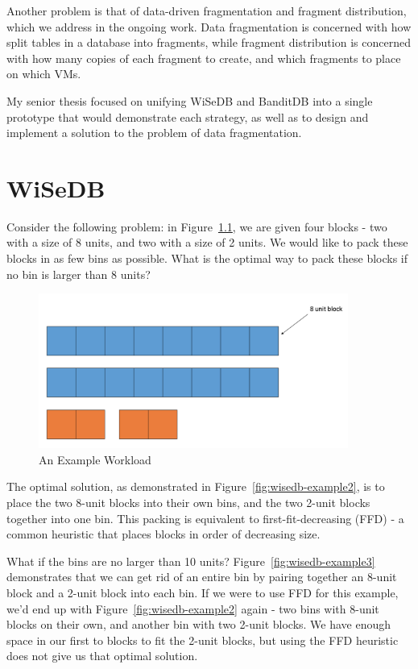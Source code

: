 \documentclass{brandiss}
\numberwithin{section}{chapter}
\numberwithin{figure}{chapter}
\theoremstyle{definition}
\theoremstyle{plain}
\theoremstyle{remark}
\begin{document}
Another problem is that of data-driven fragmentation and fragment distribution, which we address in the ongoing work. Data fragmentation is concerned with how split tables in a database into fragments, while fragment distribution is concerned with how many copies of each fragment to create, and which fragments to place on which VMs.

My senior thesis focused on unifying WiSeDB and BanditDB into a single prototype that would demonstrate each strategy, as well as to design and implement a solution to the problem of data fragmentation.

\clearpage

\chapter{WiSeDB}

Consider the following problem: in Figure~\ref{fig:wisedb-example1}, we are given four blocks - two with a size of 8 units, and two with a size of 2 units. We would like to pack these blocks in as few bins as possible. What is the optimal way to pack these blocks if no bin is larger than 8 units?

\begin{figure}[htbp]
  \centering
  \includegraphics[height=2in]{wisedb-example1}
  \caption{An Example Workload}
  \label{fig:wisedb-example1}
\end{figure}

The optimal solution, as demonstrated in Figure~\ref{fig:wisedb-example2}, is to place the two 8-unit blocks into their own bins, and the two 2-unit blocks together into one bin. This packing is equivalent to first-fit-decreasing (FFD) - a common heuristic that places blocks in order of decreasing size.

What if the bins are no larger than 10 units? Figure~\ref{fig:wisedb-example3} demonstrates that we can get rid of an entire bin by pairing together an 8-unit block and a 2-unit block into each bin. If we were to use FFD for this example, we'd end up with Figure~\ref{fig:wisedb-example2} again - two bins with 8-unit blocks on their own, and another bin with two 2-unit blocks. We have enough space in our first to blocks to fit the 2-unit blocks, but using the FFD heuristic does not give us that optimal solution.
\end{document}
